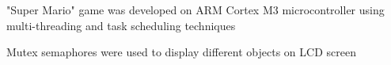 \documentclass[letterpaper, 10pt]{deedy-resume} %
\begin{document}
\begin{minipage}[t]{0.65\textwidth}






\begin{tightitemize}
\item "Super Mario" game was developed on ARM Cortex M3 microcontroller using multi-threading and task scheduling techniques
\item Mutex semaphores were used to display different objects on LCD screen
\end{tightitemize}
\sectionspace %


\end{minipage}
\end{document}
